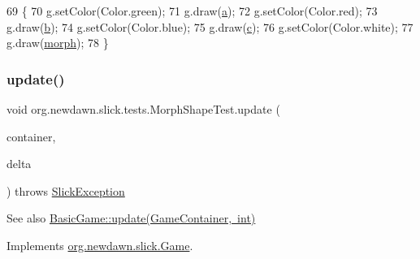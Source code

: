 \begin{DoxyCode}
69                                   \{
70         g.setColor(Color.green);
71         g.draw(\mbox{\hyperlink{classorg_1_1newdawn_1_1slick_1_1tests_1_1_morph_shape_test_aae4a7aae8b258b98057d88786a82d46d}{a}});
72         g.setColor(Color.red);
73         g.draw(\mbox{\hyperlink{classorg_1_1newdawn_1_1slick_1_1tests_1_1_morph_shape_test_a8c12651e74bf24e1b5c00aa960c8f655}{b}});
74         g.setColor(Color.blue);
75         g.draw(\mbox{\hyperlink{classorg_1_1newdawn_1_1slick_1_1tests_1_1_morph_shape_test_aafd5685d9c5de3a529add5a3f44986d2}{c}});
76         g.setColor(Color.white);
77         g.draw(\mbox{\hyperlink{classorg_1_1newdawn_1_1slick_1_1tests_1_1_morph_shape_test_aa71e79154a050babecb8bdd71caeaedd}{morph}});
78     \}
\end{DoxyCode}
\mbox{\label{classorg_1_1newdawn_1_1slick_1_1tests_1_1_morph_shape_test_a4f2df780613339a2bdeb40d77cbdbac1}} 
\subsubsection{\texorpdfstring{update()}{update()}}
{\footnotesize\ttfamily void org.\+newdawn.\+slick.\+tests.\+Morph\+Shape\+Test.\+update (\begin{DoxyParamCaption}\item[{\mbox{\hyperlink{classorg_1_1newdawn_1_1slick_1_1_game_container}{Game\+Container}}}]{container,  }\item[{int}]{delta }\end{DoxyParamCaption}) throws \mbox{\hyperlink{classorg_1_1newdawn_1_1slick_1_1_slick_exception}{Slick\+Exception}}\hspace{0.3cm}{\ttfamily [inline]}}

\begin{DoxySeeAlso}{See also}
\mbox{\hyperlink{classorg_1_1newdawn_1_1slick_1_1_basic_game_acfe6fa05aef83bff1631af91a3e4bd20}{Basic\+Game\+::update(\+Game\+Container, int)}} 
\end{DoxySeeAlso}


Implements \mbox{\hyperlink{interfaceorg_1_1newdawn_1_1slick_1_1_game_ab07b2e9463ee4631620dde0de25bdee8}{org.\+newdawn.\+slick.\+Game}}.


